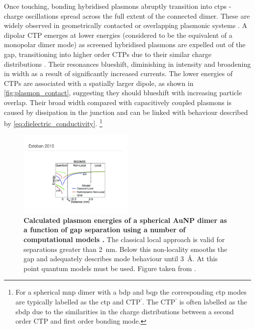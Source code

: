 \documentclass{article}
\begin{document}
Once touching, bonding hybridised plasmons abruptly transition into \glspl{ctp} - charge oscillations spread across the full extent of the connected dimer. These are widely observed in geometrically contacted or overlapping plasmonic systems \cite{atay2004, lassiter2008}. A dipolar CTP emerges at lower energies (considered to be the equivalent of a monopolar dimer mode) as screened hybridised plasmons are expelled out of the gap, transitioning into higher order CTPs due to their similar charge distributions \cite{romero2006, perez2010, perez2011, tserkezis2014}. Their resonances blueshift, diminishing in intensity and broadening in width as a result of significantly increased currents. The lower energies of CTPs are associated with a spatially larger dipole, as shown in \autoref{fig:plasmon_contact}, suggesting they should blueshift with increasing particle overlap. Their broad width compared with capacitively coupled plasmons is caused by dissipation in the junction and can be linked with behaviour described by \eqref{eq:dielectric_conductivity}.%
\footnote{For a spherical \gls{mnp} dimer with a \gls{bdp} and \gls{bqp} the corresponding \gls{ctp} modes are typically labelled as the \gls{ctp} and CTP$^\prime$. The CTP$^\prime$ is often labelled as the \gls{sbdp} due to the similarities in the charge distributions between a second order CTP and first order bonding mode.} 

\begin{figure}[bt]
\centering
\includegraphics[width=0.5\textwidth]{figures/literature/esteban2015a}
\caption[Calculated plasmon energies of a spherical AuNP dimer as a function of gap separation using a number of computational models \cite{esteban2015}]{\textbf{Calculated plasmon energies of a spherical AuNP dimer as a function of gap separation using a number of computational models \cite{esteban2015}.} The classical local approach is valid for separations greater than \SI{2}{nm}. Below this non-locality smooths the gap and adequately describes mode behaviour until \SI{3}{\angstrom}. At this point quantum models must be used. Figure taken from \cite{esteban2015}.}
\label{fig:model_comparison}
\end{figure}
\end{document}
